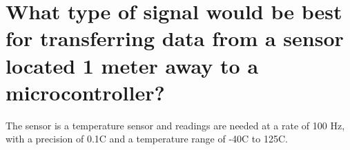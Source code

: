 \documentclass[main.tex]{subfiles}
\begin{document}
\section{What type of signal would be best for transferring data from a sensor located 1 meter away to a microcontroller?} 
The sensor is a temperature sensor and readings are needed at a rate of 100 Hz, with a precision of 0.1C and a temperature range of -40C to 125C. 

\spoilerline
\end{document}
